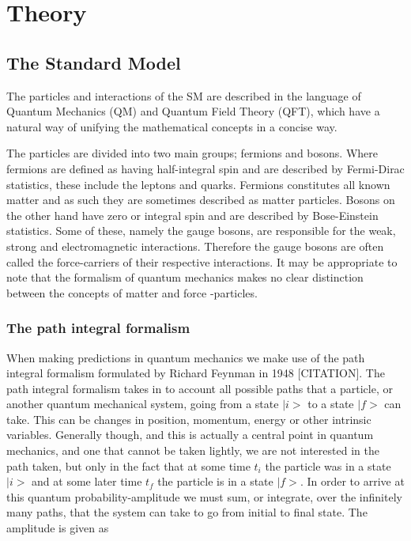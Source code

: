 \section{Theory}
\subsection{The Standard Model}
The particles and interactions of the SM are described in the language of Quantum Mechanics (QM) and Quantum Field Theory (QFT), which have a natural way of unifying the mathematical concepts in a concise way.

The particles are divided into two main groups; fermions and bosons. Where fermions are defined as having half-integral spin and are described by Fermi-Dirac statistics, these include the leptons and quarks. Fermions constitutes all known matter and as such they are sometimes described as matter particles. Bosons on the other hand have zero or integral spin and are described by Bose-Einstein statistics. Some of these, namely the gauge bosons, are responsible for the weak, strong and electromagnetic interactions. Therefore the gauge bosons are often called the force-carriers of their respective interactions. It may be appropriate to note that the formalism of quantum mechanics makes no clear distinction between the concepts of matter and force -particles.


\subsubsection{The path integral formalism}
When making predictions in quantum mechanics we make use of the path integral formalism formulated by Richard Feynman in 1948 [CITATION]. The path integral formalism takes in to account all possible paths that a particle, or another quantum mechanical system, going from a state $|i>$ to a state $|f>$ can take. This can be changes in position, momentum, energy or other intrinsic variables. Generally though, and this is actually a central point in quantum mechanics, and one that cannot be taken lightly, we are not interested in the path taken, but only in the fact that at some time $t_{i}$ the particle was in a state $|i>$ and at some later time $t_{f}$ the particle is in a state $|f>$. In order to arrive at this quantum probability-amplitude we must sum, or integrate, over  the infinitely many paths, that the system can take to go from initial to final state. The amplitude is given as \cite{richter_path_integrals}

